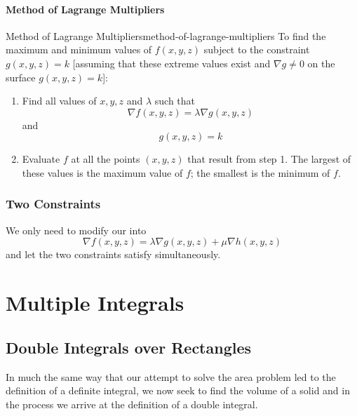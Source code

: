 \documentclass[math,code]{amznotes}
\theoremstyle{remark}
\begin{document}
\subsubsection{Method of Lagrange Multipliers}
\begin{thmbox}{Method of Lagrange Multipliers}{method-of-lagrange-multipliers}
    To find the maximum and minimum values of $f(x,y,z)$ subject to the constraint $g(x,y,z)=k$ [assuming that these extreme values exist and $\nabla g \neq 0$ on the surface $g(x,y,z)=k$]:
    \begin{enumerate}
        \item Find all values of $x,y,z$ and $\lambda$ such that
        \begin{displaymath}
            \nabla f(x,y,z) = \lambda \nabla g(x,y,z)
        \end{displaymath}
        and
        \begin{displaymath}
            g(x,y,z)=k
        \end{displaymath}
        \item Evaluate $f$ at all the points $(x,y,z)$ that result from step 1. The largest of these values is the maximum value of $f$; the smallest is the minimum of $f$.
    \end{enumerate}
\end{thmbox}
\subsection{Two Constraints}
We only need to modify our  into
\begin{displaymath}
    \nabla f(x,y,z)=\lambda \nabla g(x,y,z) + \mu \nabla h(x,y,z)
\end{displaymath}
and let the two constraints satisfy simultaneously.

\chapter{Multiple Integrals}
\section{Double Integrals over Rectangles}
In much the same way that our attempt to solve the area problem led to the definition of a definite integral, we now seek to find the volume of a solid and in the process we arrive at the definition of a double integral.
\end{document}
